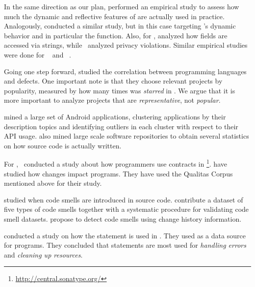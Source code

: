 In the same direction as our plan,
\cite{callauHowWhyDevelopers2013} performed an empirical study to assess
how much the dynamic and reflective features of \smalltalk{} are actually
used in practice.
Analogously, \cite{richardsAnalysisDynamicBehavior2010,richardsEvalThatMen2011,weiEmpiricalStudyDynamic2016}
conducted a similar study, but in this case targeting \javascript's dynamic
behavior and in particular the  function.
Also, for \javascript{}, \cite{madsenStringAnalysisDynamic2014} analyzed
how fields are accessed via strings,
while~\cite{jangEmpiricalStudyPrivacyviolating2010}
analyzed privacy violations.
Similar empirical studies were done for
\php~\citep{hillsEmpiricalStudyPHP2013,dahseExperienceReportEmpirical2015,doyleEmpiricalStudyEvolution2011}
and \swift~\citep{reboucasEmpiricalStudyUsage2016}.  

Going one step forward, \cite{rayLargescaleStudyProgramming2017} studied the correlation between programming languages and defects. 
One important note is that they choose relevant projects by popularity,
measured by how many times was \emph{starred} in \github.
We argue that it is more important to analyze projects that are \emph{representative}, not \emph{popular}.

\cite{gorlaCheckingAppBehavior2014} mined a large set of Android applications, clustering applications by their description topics and identifying outliers in each cluster with respect to their API usage.
\cite{grechanikEmpiricalInvestigationLargescale2010} also mined large scale software repositories to obtain several statistics on how source code is actually written.

For \java{},~\cite{dietrichContractsWildStudy2017a} conducted a study
about how programmers use contracts in \mavencentral{}\footnote{\url{http://central.sonatype.org/}}.
\cite{dietrichBrokenPromisesEmpirical2014} have studied how
\api{} changes impact \java{} programs.
They have used the Qualitas Corpus~\citep{temperoQualitasCorpusCurated2010} mentioned above for their study.

\cite{tufanoWhenWhyYour2015,tufanoWhenWhyYour2017} studied when code
smells are introduced in source code.
\cite{palombaLandfillOpenDataset2015}
contribute a dataset of five types of code smells together with a systematic procedure for validating code smell datasets.
\cite{palombaDetectingBadSmells2013} propose to detect code smells using change history information.

\cite{nagappanEmpiricalStudyGoto2015} conducted a study on how the
 statement is used in \cc.
They used \github{} as a data source for \cc{} programs.
They concluded that  statements are most used for
\emph{handling errors} and \emph{cleaning up resources}.

